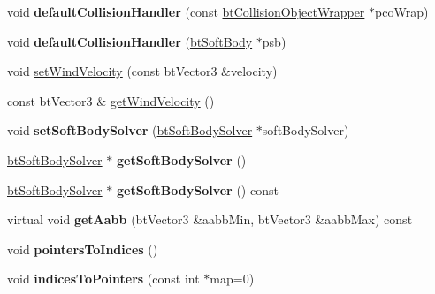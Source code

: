 \begin{DoxyCompactItemize}
\item 
\hypertarget{classbt_soft_body_a2efae0290d22ed8c05ef4540586283c5}{void {\bfseries default\+Collision\+Handler} (const \hyperlink{structbt_collision_object_wrapper}{bt\+Collision\+Object\+Wrapper} $\ast$pco\+Wrap)}\label{classbt_soft_body_a2efae0290d22ed8c05ef4540586283c5}

\item 
\hypertarget{classbt_soft_body_a08d6032177bb1e5b8d89bc425c9b1d27}{void {\bfseries default\+Collision\+Handler} (\hyperlink{classbt_soft_body}{bt\+Soft\+Body} $\ast$psb)}\label{classbt_soft_body_a08d6032177bb1e5b8d89bc425c9b1d27}

\item 
void \hyperlink{classbt_soft_body_aee9ac69662731fa96ae2357522972ef9}{set\+Wind\+Velocity} (const bt\+Vector3 \&velocity)
\item 
const bt\+Vector3 \& \hyperlink{classbt_soft_body_a71de05c3c56952a4d76e09ca9ca9cce0}{get\+Wind\+Velocity} ()
\item 
\hypertarget{classbt_soft_body_a4aebc3e54046a5748331e3e17b5d3efc}{void {\bfseries set\+Soft\+Body\+Solver} (\hyperlink{classbt_soft_body_solver}{bt\+Soft\+Body\+Solver} $\ast$soft\+Body\+Solver)}\label{classbt_soft_body_a4aebc3e54046a5748331e3e17b5d3efc}

\item 
\hypertarget{classbt_soft_body_a18b1a7b609c7a84d9f8cf0add29d180f}{\hyperlink{classbt_soft_body_solver}{bt\+Soft\+Body\+Solver} $\ast$ {\bfseries get\+Soft\+Body\+Solver} ()}\label{classbt_soft_body_a18b1a7b609c7a84d9f8cf0add29d180f}

\item 
\hypertarget{classbt_soft_body_adb946b94b8629727e2f0c2d7748c9d2b}{\hyperlink{classbt_soft_body_solver}{bt\+Soft\+Body\+Solver} $\ast$ {\bfseries get\+Soft\+Body\+Solver} () const }\label{classbt_soft_body_adb946b94b8629727e2f0c2d7748c9d2b}

\item 
\hypertarget{classbt_soft_body_a2bfb86d186a1ed0235fed0e1d33c2295}{virtual void {\bfseries get\+Aabb} (bt\+Vector3 \&aabb\+Min, bt\+Vector3 \&aabb\+Max) const }\label{classbt_soft_body_a2bfb86d186a1ed0235fed0e1d33c2295}

\item 
\hypertarget{classbt_soft_body_ab0c0d590f7b945029af1f5afc26b58ab}{void {\bfseries pointers\+To\+Indices} ()}\label{classbt_soft_body_ab0c0d590f7b945029af1f5afc26b58ab}

\item 
\hypertarget{classbt_soft_body_ae7d0c0ae69ea5801118a049f590fe703}{void {\bfseries indices\+To\+Pointers} (const int $\ast$map=0)}\label{classbt_soft_body_ae7d0c0ae69ea5801118a049f590fe703}


\end{DoxyCompactItemize}
